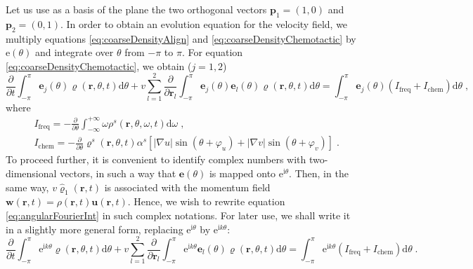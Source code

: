 \documentclass{article}
\begin{document}
Let us use as a basis of the plane the two orthogonal vectors $\mathbf{p}_1=(1,0)$ and $\mathbf{p}_2=(0,1)$. In order to obtain an evolution equation for the velocity field, we multiply equations \eqref{eq:coarseDensityAlign} and \eqref{eq:coarseDensityChemotactic} by $\mathrm{e}\left(\theta\right)$ and integrate over $\theta$ from $-\pi$ to $\pi$. For equation \eqref{eq:coarseDensityChemotactic}, we obtain ($j=1,2$)
\begin{equation}
    \label{eq:angularFourierInt}
    \frac{\partial}{\partial t}\int_{-\pi}^{\pi}{\mathbf{e}_j\left( \theta \right) \varrho \left( \mathbf{r},\theta ,t \right) \mathrm{d}\theta}+v\sum_{l=1}^2{\frac{\partial}{\partial \mathbf{r}_l}\int_{-\pi}^{\pi}{\mathbf{e}_j\left( \theta \right) \mathbf{e}_l\left( \theta \right) \varrho \left( \mathbf{r},\theta ,t \right) \mathrm{d}\theta}}=\int_{-\pi}^{\pi}{\mathbf{e}_j\left( \theta \right) \left( I_{\mathrm{freq}}+I_{\mathrm{chem}} \right) \mathrm{d}\theta}\;,
\end{equation}
where 
\begin{subequations}
    \label{eq:angularFourierIntSub}
    \begin{align}
        &I_{\mathrm{freq}}=-\frac{\partial}{\partial \theta}\int_{-\infty}^{+\infty}{\omega \rho ^s\left( \mathbf{r},\theta ,\omega ,t \right) \mathrm{d}\omega}\;,\\
        &I_{\mathrm{chem}}=-\frac{\partial}{\partial \theta}\varrho ^s\left( \mathbf{r},\theta ,t \right) \alpha ^s\left[ \left| \nabla u \right|\sin \left( \theta +\varphi _u \right) +\left| \nabla v \right|\sin \left( \theta +\varphi _v \right) \right]\;.
    \end{align}
\end{subequations}
To proceed further, it is convenient to identify complex numbers with two-dimensional vectors, in such a way that $\mathbf{e}(\theta)$ is mapped onto $\mathrm{e}^{\mathrm{i}\theta}$. Then, in the same way, $v\hat{\varrho}_1\left( \mathbf{r},t \right) $ is associated with the momentum field $\mathbf{w}\left( \mathbf{r},t \right) =\rho \left( \mathbf{r},t \right) \mathbf{u}\left( \mathbf{r},t \right) $. Hence, we wish to rewrite equation \eqref{eq:angularFourierInt} in such complex notations. For later use, we shall write it in a slightly more general form, replacing $\mathrm{e}^{\mathrm{i}\theta}$ by $\mathrm{e}^{\mathrm{i}k \theta}$:
\begin{equation}
    \label{eq:angularFourierIntComplex}
    \frac{\partial}{\partial t}\int_{-\pi}^{\pi}{\mathrm{e}^{\mathrm{i}k\theta}\varrho \left( \mathbf{r},\theta ,t \right) \mathrm{d}\theta}+v\sum_{l=1}^2{\frac{\partial}{\partial \mathbf{r}_l}\int_{-\pi}^{\pi}{\mathrm{e}^{\mathrm{i}k\theta}\mathbf{e}_l\left( \theta \right) \varrho \left( \mathbf{r},\theta ,t \right) \mathrm{d}\theta}}=\int_{-\pi}^{\pi}{\mathrm{e}^{\mathrm{i}k\theta}\left( I_{\mathrm{freq}}+I_{\mathrm{chem}} \right) \mathrm{d}\theta}\;.
\end{equation}
\end{document}
